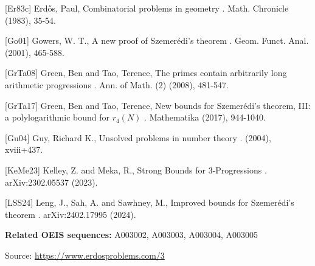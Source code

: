 \documentclass{article}
\begin{document}
[Er83c] Erd\H{o}s, Paul, Combinatorial problems in geometry . Math. Chronicle (1983), 35-54.

[Go01] Gowers, W. T., A new proof of Szemer\'{e}di's theorem . Geom. Funct. Anal. (2001), 465-588.

[GrTa08] Green, Ben and Tao, Terence, The primes contain arbitrarily long arithmetic progressions . Ann. of Math. (2) (2008), 481-547.

[GrTa17] Green, Ben and Tao, Terence, New bounds for Szemer\'{e}di's theorem, III: a polylogarithmic bound for $r_4(N)$ . Mathematika (2017), 944-1040.

[Gu04] Guy, Richard K., Unsolved problems in number theory . (2004), xviii+437.

[KeMe23] Kelley, Z. and Meka, R., Strong Bounds for 3-Progressions . arXiv:2302.05537 (2023).

[LSS24] Leng, J., Sah, A. and Sawhney, M., Improved bounds for Szemer\'{e}di's theorem . arXiv:2402.17995 (2024).

\noindent\textbf{Related OEIS sequences:} A003002, A003003, A003004, A003005


\bigskip
\noindent\small{Source: \url{https://www.erdosproblems.com/3}}
\end{document}
